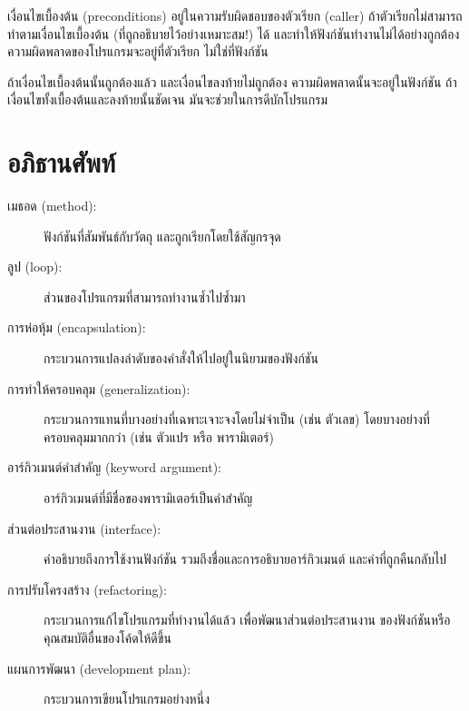 เงื่อนไขเบื้องต้น (preconditions) อยู่ในความรับผิดชอบของตัวเรียก (caller) ถ้าตัวเรียกไม่สามารถทำตามเงื่อนไขเบื้องต้น 
(ที่ถูกอธิบายไว้อย่างเหมาะสม!) ได้ และทำให้ฟังก์ชันทำงานไม่ได้อย่างถูกต้อง ความผิดพลาดของโปรแกรมจะอยู่ที่ตัวเรียก 
ไม่ใช่ที่ฟังก์ชัน

ถ้าเงื่อนไขเบื้องต้นนั้นถูกต้องแล้ว และเงื่อนไขลงท้ายไม่ถูกต้อง ความผิดพลาดนั้นจะอยู่ในฟังก์ชัน
ถ้าเงื่อนไขทั้งเบื้องต้นและลงท้ายนั้นชัดเจน มันจะช่วยในการดีบักโปรแกรม


\section{อภิธานศัพท์}

\begin{description}

\item[เมธอด (method):] ฟังก์ชันที่สัมพันธ์กับวัตถุ และถูกเรียกโดยใช้สัญกรจุด

\item[ลูป (loop):] ส่วนของโปรแกรมที่สามารถทำงานซ้ำไปซ้ำมา 

\item[การห่อหุ้ม (encapsulation):] กระบวนการแปลงลำดับของคำสั่งให้ไปอยู่ในนิยามของฟังก์ชัน 

\item[การทำให้ครอบคลุม (generalization):] กระบวนการแทนที่บางอย่างที่เฉพาะเจาะจงโดยไม่จำเป็น (เช่น ตัวเลข)
โดยบางอย่างที่ครอบคลุมมากกว่า (เช่น ตัวแปร หรือ พารามิเตอร์)

\item[อาร์กิวเมนต์คำสำคัญ (keyword argument):] อาร์กิวเมนต์ที่มีชื่อของพารามิเตอร์เป็นคำสำคัญ

\item[ส่วนต่อประสานงาน (interface):] คำอธิบายถึงการใช้งานฟังก์ชัน รวมถึงชื่อและการอธิบายอาร์กิวเมนต์
และค่าที่ถูกคืนกลับไป

\item[การปรับโครงสร้าง (refactoring):] กระบวนการแก้ไขโปรแกรมที่ทำงานได้แล้ว เพื่อพัฒนาส่วนต่อประสานงาน
ของฟังก์ชันหรือคุณสมบัติอื่นของโค้ดให้ดีขึ้น

\item[แผนการพัฒนา (development plan):] กระบวนการเขียนโปรแกรมอย่างหนึ่ง


\end{description}

